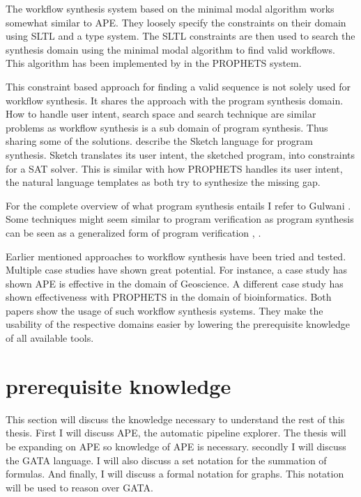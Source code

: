 \documentclass{article}
\begin{document}
The workflow synthesis system\cite{lamprecht2010synthesis} based on the minimal modal algorithm\cite{Steffen93moduleconfiguration} works somewhat similar to APE.
They loosely specify the constraints on their domain using SLTL and a type system. The SLTL constraints are then used to search the synthesis domain using the minimal modal algorithm to find valid workflows.  
This algorithm has been implemented by \cite{Prophets} in the PROPHETS system.


This constraint based approach for finding a valid sequence is not solely used for workflow synthesis. It shares the approach with the program synthesis domain. How to handle user intent, search space and search technique \cite{gulwani2010dimensions} are similar problems as workflow synthesis is a sub domain of program synthesis. Thus sharing some of the solutions. \cite{solar2008program} describe the Sketch language for program synthesis. Sketch translates its user intent, the sketched program, into constraints for a SAT solver. This is similar with how PROPHETS handles its user intent, the natural language templates as both try to synthesize the missing gap. 


For the complete overview of what program synthesis entails I refer to Gulwani \cite{program_synthesis}. Some techniques might seem similar to program verification as program synthesis can be seen as a generalized form of program verification \cite{gulwani2011loopfree}, \cite{verificationToSynthesis}.


Earlier mentioned approaches to workflow synthesis have been tried and tested. Multiple case studies have shown great potential. For instance, a case study \cite{kasalica2019workflow} has shown APE is effective in the domain of Geoscience. A different case study \cite{palmblad2019automated} has shown effectiveness with PROPHETS in the domain of bioinformatics. Both papers show the usage of such workflow synthesis systems. They make the usability of the respective domains easier by lowering the prerequisite knowledge of all available tools. 

\section{prerequisite knowledge}
This section will discuss the knowledge necessary to understand the rest of this thesis. First I will discuss APE, the automatic pipeline explorer. The thesis will be expanding on APE so knowledge of APE is necessary. secondly I will discuss the GATA language. I will also discuss a set notation for the summation of formulas. And finally, I will discuss a formal notation for graphs. This notation will be used to reason over GATA. 
\end{document}
